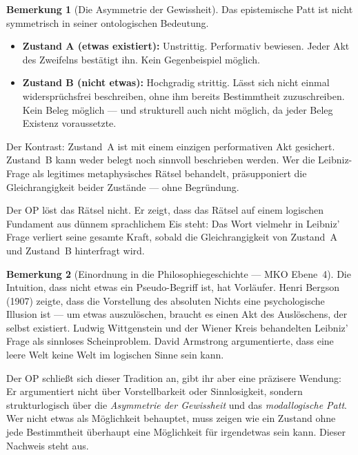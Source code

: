 \documentclass[11pt,a4paper]{article}
\theoremstyle{plain}
\theoremstyle{definition}
\newtheorem{remark}{Bemerkung}[section]
\begin{document}
\begin{remark}[Die Asymmetrie der Gewissheit]
Das epistemische Patt ist nicht symmetrisch in seiner ontologischen Bedeutung.

\begin{itemize}
  \item \textbf{Zustand A (etwas existiert):} Unstrittig. Performativ bewiesen.
        Jeder Akt des Zweifelns best\"{a}tigt ihn. Kein Gegenbeispiel m\"{o}glich.
  \item \textbf{Zustand B (nicht etwas):} Hochgradig strittig. L\"{a}sst sich nicht
        einmal widerspr\"{u}chsfrei beschreiben, ohne ihm bereits Bestimmtheit
        zuzuschreiben. Kein Beleg m\"{o}glich --- und strukturell auch nicht m\"{o}glich,
        da jeder Beleg Existenz voraussetzte.
\end{itemize}

Der Kontrast: Zustand~A ist mit einem einzigen performativen Akt gesichert. Zustand~B
kann weder belegt noch sinnvoll beschrieben werden. Wer die Leibniz-Frage als legitimes
metaphysisches R\"{a}tsel behandelt, pr\"{a}supponiert die Gleichrangigkeit beider
Zust\"{a}nde --- ohne Begr\"{u}ndung.

Der OP l\"{o}st das R\"{a}tsel nicht. Er zeigt, dass das R\"{a}tsel auf einem logischen
Fundament aus d\"{u}nnem sprachlichem Eis steht: Das Wort \glqq{}vielmehr\grqq{} in
Leibniz' Frage verliert seine gesamte Kraft, sobald die Gleichrangigkeit von Zustand~A
und Zustand~B hinterfragt wird.
\end{remark}

\begin{remark}[Einordnung in die Philosophiegeschichte --- MKO Ebene~4]
Die Intuition, dass \glqq{}nicht etwas\grqq{} ein Pseudo-Begriff ist, hat Vorl\"{a}ufer.
Henri Bergson (1907) zeigte, dass die Vorstellung des absoluten Nichts eine psychologische
Illusion ist --- um etwas auszul\"{o}schen, braucht es einen Akt des Ausl\"{o}schens, der
selbst existiert. Ludwig Wittgenstein und der Wiener Kreis behandelten Leibniz' Frage als
sinnloses Scheinproblem. David Armstrong argumentierte, dass eine \glqq{}leere Welt\grqq{}
keine Welt im logischen Sinne sein kann.

Der OP schlie\ss{}t sich dieser Tradition an, gibt ihr aber eine pr\"{a}zisere Wendung:
Er argumentiert nicht \"{u}ber Vorstellbarkeit oder Sinnlosigkeit, sondern strukturlogisch
\"{u}ber die \emph{Asymmetrie der Gewissheit} und das \emph{modallogische Patt}. Wer
\glqq{}nicht etwas\grqq{} als M\"{o}glichkeit behauptet, muss zeigen wie ein Zustand ohne
jede Bestimmtheit \"{u}berhaupt eine \glqq{}M\"{o}glichkeit\grqq{} f\"{u}r irgendetwas
sein kann. Dieser Nachweis steht aus.
\end{remark}
\end{document}
